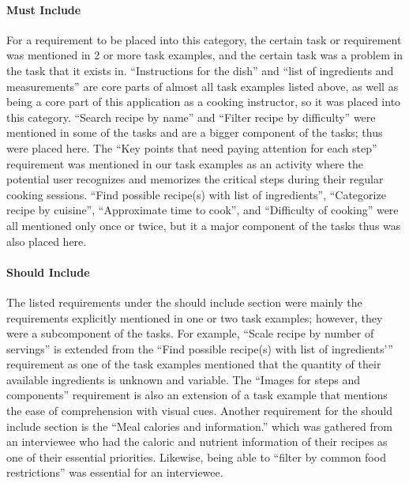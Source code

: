 \documentclass[11pt,english]{article}
\begin{document}
\paragraph{Must Include}
For a requirement to be placed into this category, the certain task or requirement was mentioned in 2 or more task examples, and the certain task was a problem in the task that it exists in. “Instructions for the dish” and “list of ingredients and measurements” are core parts of almost all task examples listed above, as well as being a core part of this application as a cooking instructor, so it was placed into this category. “Search recipe by name” and “Filter recipe by difficulty” were mentioned in some of the tasks and are a bigger component of the tasks; thus were placed here. The “Key points that need paying attention for each step” requirement was mentioned in our task examples as an activity where the potential user recognizes and memorizes the critical steps during their regular cooking sessions. “Find possible recipe(s) with list of ingredients”, “Categorize recipe by cuisine”, “Approximate time to cook”, and “Difficulty of cooking” were all mentioned only once or twice, but it a major component of the tasks thus was also placed here. 
\paragraph{Should Include}
The listed requirements under the should include section were mainly the requirements explicitly mentioned in one or two task examples; however, they were a subcomponent of the tasks. For example, “Scale recipe by number of servings” is extended from the “Find possible recipe(s) with list of ingredients’” requirement as one of the task examples mentioned that the quantity of their available ingredients is unknown and variable. The “Images for steps and components” requirement is also an extension of a task example that mentions the ease of comprehension with visual cues. Another requirement for the should include section is the “Meal calories and information.” which was gathered from an interviewee who had the caloric and nutrient information of their recipes as one of their essential priorities. Likewise, being able to “filter by common food restrictions” was essential for an interviewee.
\end{document}
